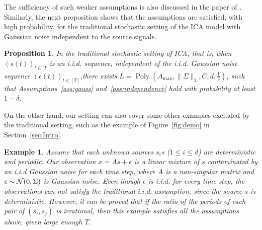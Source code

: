 \documentclass[jmlr]{article}
\newcommand{\todoa}[2][]{ \todo[color=Purple!20,size=\tiny,#1]{#2}} %
\newcommand{\cN}{\cal{N}}
\newcommand{\iid}{i.i.d.\xspace}
\DeclareMathOperator{\pol}{Poly}
\newcommand{\poly}[1]{\pol\left(#1\right)}
\newtheorem{example}[lemma]{Example}
\newtheorem{prop}[lemma]{Proposition}
\theoremstyle{definition}
\newcommand{\eps}{\epsilon}
\begin{document}
The sufficiency of such weaker assumptions is also discussed in the paper of \citet{frieze1996learning}.
Similarly, the next proposition shows that the assumptions are satisfied, with high probability, for the traditional stochastic setting of the ICA model with Gaussian noise independent to the source signals.
\begin{prop}
\label{prop:stochasticAss}
In the traditional stochastic setting of ICA, that is, when $(s(t))_{t\in[T}$ is an \iid sequence, independent of the \iid Gaussian noise sequence $(\epsilon(t))_{t\in[T]}$,there exists $L = \poly{A_{\max}, \|\Sigma\|_2, C, d,\frac{1}{\delta}}$, such that Assumptions~\ref{ass:gauss} and~\ref{ass:independence} hold with probability at least $1-\delta$.
\end{prop}
On the other hand, our setting can also cover some other examples excluded by the traditional setting, such as the example of Figure~\ref{fig:demo} in Section~\ref{sec:Intro}.
\begin{example} \em
Assume that each unknown sources $s_i$s ($1\le i\le d$) are deterministic and periodic. Our observation $x=As+\eps$ is a linear mixture of $s$ contaminated by an i.i.d Gaussian noise for each time step, where $A$ is a non-singular matrix and $\eps\sim {\cN}(0,\Sigma)$ is Gaussian noise.   
Even though $\eps$ is i.i.d. for every time step, the observations can not satisfy the traditional i.i.d. assumption, since the source $s$ is deterministic. However, it can be proved that if the ratio of the periods of each pair of $(s_i, s_j)$ is irrational, then this example satisfies all the assumptions above, given large enough $T$.   
\end{example}
\end{document}
